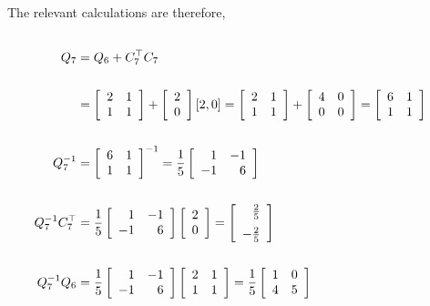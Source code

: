 \documentclass[letterpaper]{article}
\begin{document}
\begin{enumerate}
The relevant calculations are therefore,
    \begin{align*}  \\
Q_{7} &= Q_6+C_{7}^\top C_{7} \\
\\
&= \left[ \begin{array}{rr}  2&  1\\  1& 1\end{array} \right] + \left[ \begin{array}{c} 2 \\ 0 \end{array} \right] [ 2, 0] = \left[ \begin{array}{rr}  2&  1\\  1& 1\end{array} \right] + \left[ \begin{array}{rr}  4&  0\\  0&0\end{array} \right] = \left[ \begin{array}{rr}  6&  1\\  1& 1\end{array} \right] \\
\\
Q_{7}^{-1} &=  \left[ \begin{array}{rr}  6&  1\\  1& 1\end{array} \right]^{-1} = \frac{1}{5}\left[ \begin{array}{rr}  1&  -1\\  -1& 6\end{array} \right] \\
\\
Q_{7}^{-1}C_7^\top &= \frac{1}{5}\left[ \begin{array}{rr}  1&  -1\\  -1& 6\end{array} \right] \left[ \begin{array}{c} 2 \\ 0 \end{array} \right] = \left[ \begin{array}{r} \frac{2}{5}  \medskip \\ -\frac{2}{5}\end{array} \right]\\
\\
Q_{7}^{-1}Q_6&= \frac{1}{5}\left[ \begin{array}{rr}  1&  -1\\  -1& 6\end{array} \right]  \left[ \begin{array}{rr}  2&  1\\  1& 1\end{array} \right] = \frac{1}{5}\left[ \begin{array}{rr}  1&  0\\  4& 5\end{array} \right]
 \end{align*}


\end{enumerate}
\end{document}
